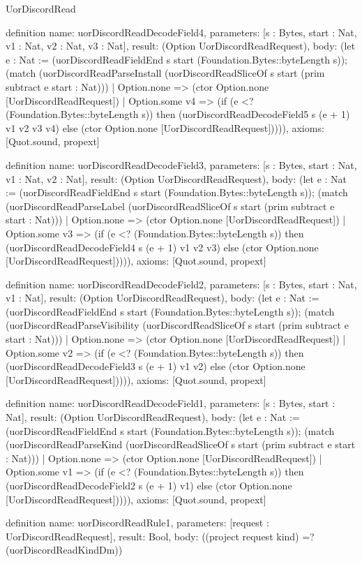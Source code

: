 \begin{lexlean}{UorDiscordRead}
\begin{semanticmodule}
definition{
  name: uorDiscordReadDecodeField4,
  parameters: [s : Bytes, start : Nat, v1 : Nat, v2 : Nat, v3 : Nat],
  result: (Option UorDiscordReadRequest),
  body: (let e : Nat := (uorDiscordReadFieldEnd s start (Foundation.Bytes::byteLength s)); (match (uorDiscordReadParseInstall (uorDiscordReadSliceOf s start (prim subtract e start : Nat)))
    | Option.none => (ctor Option.none [UorDiscordReadRequest])
    | Option.some v4 => (if (e <? (Foundation.Bytes::byteLength s)) then (uorDiscordReadDecodeField5 s (e + 1) v1 v2 v3 v4) else (ctor Option.none [UorDiscordReadRequest])))),
  axioms: [Quot.sound, propext]
}

definition{
  name: uorDiscordReadDecodeField3,
  parameters: [s : Bytes, start : Nat, v1 : Nat, v2 : Nat],
  result: (Option UorDiscordReadRequest),
  body: (let e : Nat := (uorDiscordReadFieldEnd s start (Foundation.Bytes::byteLength s)); (match (uorDiscordReadParseLabel (uorDiscordReadSliceOf s start (prim subtract e start : Nat)))
    | Option.none => (ctor Option.none [UorDiscordReadRequest])
    | Option.some v3 => (if (e <? (Foundation.Bytes::byteLength s)) then (uorDiscordReadDecodeField4 s (e + 1) v1 v2 v3) else (ctor Option.none [UorDiscordReadRequest])))),
  axioms: [Quot.sound, propext]
}

definition{
  name: uorDiscordReadDecodeField2,
  parameters: [s : Bytes, start : Nat, v1 : Nat],
  result: (Option UorDiscordReadRequest),
  body: (let e : Nat := (uorDiscordReadFieldEnd s start (Foundation.Bytes::byteLength s)); (match (uorDiscordReadParseVisibility (uorDiscordReadSliceOf s start (prim subtract e start : Nat)))
    | Option.none => (ctor Option.none [UorDiscordReadRequest])
    | Option.some v2 => (if (e <? (Foundation.Bytes::byteLength s)) then (uorDiscordReadDecodeField3 s (e + 1) v1 v2) else (ctor Option.none [UorDiscordReadRequest])))),
  axioms: [Quot.sound, propext]
}

definition{
  name: uorDiscordReadDecodeField1,
  parameters: [s : Bytes, start : Nat],
  result: (Option UorDiscordReadRequest),
  body: (let e : Nat := (uorDiscordReadFieldEnd s start (Foundation.Bytes::byteLength s)); (match (uorDiscordReadParseKind (uorDiscordReadSliceOf s start (prim subtract e start : Nat)))
    | Option.none => (ctor Option.none [UorDiscordReadRequest])
    | Option.some v1 => (if (e <? (Foundation.Bytes::byteLength s)) then (uorDiscordReadDecodeField2 s (e + 1) v1) else (ctor Option.none [UorDiscordReadRequest])))),
  axioms: [Quot.sound, propext]
}

definition{
  name: uorDiscordReadRule1,
  parameters: [request : UorDiscordReadRequest],
  result: Bool,
  body: ((project request kind) =? (uorDiscordReadKindDm))
}


\end{semanticmodule}
\end{lexlean}

